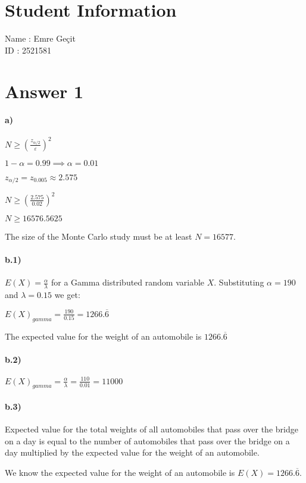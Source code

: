 \documentclass[12pt]{article}
\begin{document}
\section*{Student Information}

Name : Emre Geçit\\

ID : 2521581\\

\section*{Answer 1}
\paragraph{a)}
$N \geq (\frac{z_{\alpha/2}}{\varepsilon })^2$

$ 1 - \alpha = 0.99 \implies \alpha = 0.01$

$z_{\alpha/2} = z_{0.005} \approx 2.575$

$N \geq (\frac{2.575}{0.02})^2$

$N \geq 16576.5625$

The size of the Monte Carlo study must be at least $N = 16577$.
\paragraph{b.1)}
$E(X)  = \frac{\alpha}{\lambda}$ for a Gamma distributed random variable $X$.
Substituting $\alpha = 190$ and $\lambda = 0.15$ we get:

$E(X)_{gamma}  = \frac{190}{0.15} = 1266.\overline{6}$

The expected value for the weight of an automobile is $1266.\overline{6}$\\

\paragraph{b.2)}
$E(X)_{gamma} = \frac{\alpha}{\lambda} = \frac{110}{0.01} = 11000$

\paragraph{b.3)}
Expected value for the total weights of all automobiles that pass over the bridge on a
day is equal to the number of automobiles that pass over the bridge on a day multiplied by the expected value for the weight of an automobile.

We know the expected value for the weight of an automobile is $E(X) = 1266.\overline{6}$.
\end{document}
